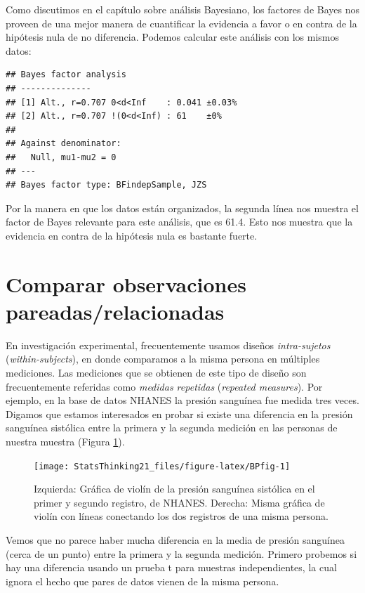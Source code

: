 \documentclass[
  12pt,
]{book}
\begin{document}
Como discutimos en el capítulo sobre análisis Bayesiano, los factores de Bayes nos proveen de una mejor manera de cuantificar la evidencia a favor o en contra de la hipótesis nula de no diferencia. Podemos calcular este análisis con los mismos datos:

\begin{verbatim}
## Bayes factor analysis
## --------------
## [1] Alt., r=0.707 0<d<Inf    : 0.041 ±0.03%
## [2] Alt., r=0.707 !(0<d<Inf) : 61    ±0%
## 
## Against denominator:
##   Null, mu1-mu2 = 0 
## ---
## Bayes factor type: BFindepSample, JZS
\end{verbatim}

Por la manera en que los datos están organizados, la segunda línea nos muestra el factor de Bayes relevante para este análisis, que es 61.4. Esto nos muestra que la evidencia en contra de la hipótesis nula es bastante fuerte.

\hypertarget{paired-ttests}{%
\section{Comparar observaciones pareadas/relacionadas}\label{paired-ttests}}

En investigación experimental, frecuentemente usamos diseños \emph{intra-sujetos} (\emph{within-subjects}), en donde comparamos a la misma persona en múltiples mediciones. Las mediciones que se obtienen de este tipo de diseño son frecuentemente referidas como \emph{medidas repetidas} (\emph{repeated measures}). Por ejemplo, en la base de datos NHANES la presión sanguínea fue medida tres veces. Digamos que estamos interesados en probar si existe una diferencia en la presión sanguínea sistólica entre la primera y la segunda medición en las personas de nuestra muestra (Figura \ref{fig:BPfig}).

\begin{figure}
\texttt{[image: StatsThinking21\_files/figure-latex/BPfig-1]} \caption{Izquierda: Gráfica de violín de la presión sanguínea sistólica en el primer y segundo registro, de NHANES. Derecha: Misma gráfica de violín con líneas conectando los dos registros de una misma persona.}\label{fig:BPfig}
\end{figure}

Vemos que no parece haber mucha diferencia en la media de presión sanguínea (cerca de un punto) entre la primera y la segunda medición. Primero probemos si hay una diferencia usando un prueba t para muestras independientes, la cual ignora el hecho que pares de datos vienen de la misma persona.
\end{document}
